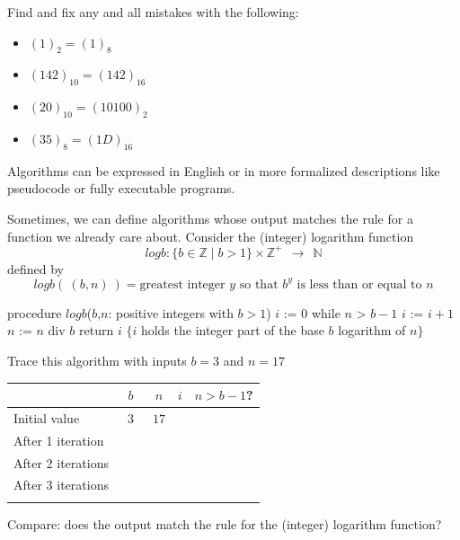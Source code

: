 \documentclass[12pt, oneside]{article}
\begin{document}
Find and fix any and all mistakes with the following:
\begin{itemize}
\item[(a)] $(1)_2 = (1)_8$
\item[(b)] $(142)_{10} = (142)_{16}$
\item[(c)] $(20)_{10} = (10100)_2$
\item[(d)] $(35)_8 = (1D)_{16}$
\end{itemize} 


Algorithms can be expressed in English or in more formalized descriptions like pseudocode or fully executable programs.


Sometimes, we can define algorithms whose output matches the 
rule for a function we already care about. Consider the (integer) logarithm function
\[
logb  : \{b \in \mathbb{Z} \mid b >1 \}  \times \mathbb{Z}^+ ~~\to~~ \mathbb{N}
\]
defined by 
\[
logb (~ (b,n)~) =  \text{greatest integer } y \text{ so that } b^y  \text{ is less than or equal to } n 
\]



\begin{algorithm}[caption={Calculating integer part of base $b$ logarithm}]
   procedure $logb$($b$,$n$: positive integers with $b > 1$)
   $i$ := $0$
   while $n$ > $b-1$
     $i$ := $i + 1$
     $n$ := $n$ div $b$
   return $i$ $\{ i$ holds the integer part of the base $b$ logarithm of $n\}$
\end{algorithm} 
Trace this algorithm with inputs $b=3$ and $n=17$

\vfill
  \begin{tabular}{l|c|c|c|c}
  & $b$ & $n$ & $i$  & $n > b-1$?\\
  \hline 
  Initial value & ~$3$~ & $17$ & \phantom{$0$} & \phantom{~Yes~}\\
  After 1 iteration  & \phantom{$3$} & \phantom{$5$} & \phantom{$1$} & \phantom{T}\\
  After 2 iterations & \phantom{$3$} & \phantom{$1$} & \phantom{$2$} & \phantom{F}\\
  After 3 iterations &  &  & & \\
  &&&&\\
  \end{tabular}

\vfill

\vfill

Compare: does the output match the rule for the (integer) logarithm function?
\end{document}
